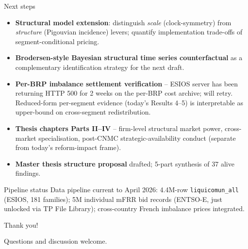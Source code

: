 \documentclass[aspectratio=169,10pt]{beamer}
\begin{document}
\begin{frame}{Next steps}
\begin{itemize}
  \item \textbf{Structural model extension}: distinguish \emph{scale} (clock-symmetry) from \emph{structure} (Pigouvian incidence) levers; quantify implementation trade-offs of segment-conditional pricing.
  \item \textbf{Brodersen-style Bayesian structural time series counterfactual} \citep{Brodersen_2015,CausalImpact15min} as a complementary identification strategy for the next draft.
  \item \textbf{Per-BRP imbalance settlement verification} -- ESIOS server has been returning HTTP 500 for 2 weeks on the per-BRP cost archive; will retry. Reduced-form per-segment evidence (today's Results 4--5) is interpretable as upper-bound on cross-segment redistribution.
  \item \textbf{Thesis chapters Parts II--IV} -- firm-level structural market power, cross-market specialisation, post-CNMC strategic-availability conduct (separate from today's reform-impact frame).
  \item \textbf{Master thesis structure proposal} drafted; 5-part synthesis of 37 alive findings.
\end{itemize}

\vspace{0.5em}
\begin{block}{Pipeline status}
\footnotesize
Data pipeline current to April 2026: 4.4M-row \texttt{liquicomun\_all} (ESIOS, 181 families); 5M individual mFRR bid records (ENTSO-E, just unlocked via TP File Library); cross-country French imbalance prices integrated.
\end{block}
\end{frame}


\begin{frame}[plain]
  \centering
  \Large Thank you!
  \vspace{1em}

  \normalsize
  Questions and discussion welcome.
\end{frame}


\end{document}
